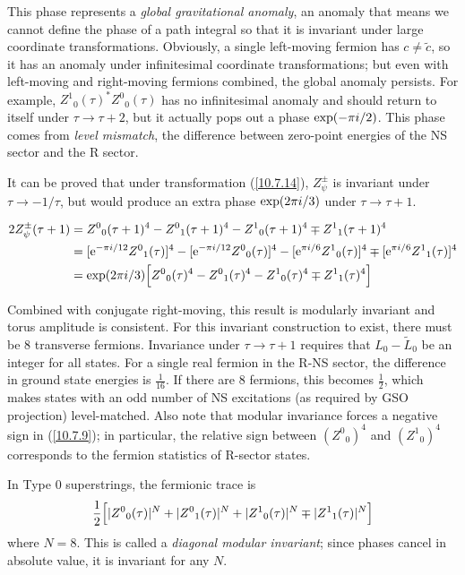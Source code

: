 	This phase represents a \emph{global gravitational anomaly}, an anomaly that means we cannot define the phase of a path integral so that it is invariant under large coordinate transformations. Obviously, a single left-moving fermion has $c\neq\tilde{c}$, so it has an anomaly under infinitesimal coordinate transformations; but even with left-moving and right-moving fermions combined, the global anomaly persists. For example, $Z^{1}{}_{0}(\tau)^{\ast}Z^{0}{}_{0}(\tau)$ has no infinitesimal anomaly and should return to itself under $\tau\to\tau+2$, but it actually pops out a phase $\exp(-\pi i/2)$. This phase comes from \emph{level mismatch}, the difference between zero-point energies of the NS sector and the R sector.
	
	It can be proved that under transformation (\ref{10.7.14}), $Z_{\psi}^{\pm}$ is invariant under $\tau\to-1/\tau$, but would produce an extra phase $\exp(2\pi i/3)$ under $\tau\to\tau+1$.
	\begin{tcolorbox}[breakable]
		\begin{align*}
			2Z_{\psi}^{\pm}(\tau+1) &=Z^{0}{}_{0}(\tau+1)^{4}-Z^{0}{}_{1}(\tau+1)^{4}-Z^{1}{}_{0}(\tau+1)^{4}\mp Z^{1}{}_{1}(\tau+1)^{4} \\
			&= [\mathrm{e}^{-\pi i/12}Z^{0}{}_{1}(\tau)]^{4}-[\mathrm{e}^{-\pi i/12}Z^{0}{}_{0}(\tau)]^{4}
			-[\mathrm{e}^{\pi i/6}Z^{1}{}_{0}(\tau)]^{4}\mp[\mathrm{e}^{\pi i/6}Z^{1}{}_{1}(\tau)]^{4} \\
			&=\exp(2\pi i/3)\Bigl[Z^{0}{}_{0}(\tau)^{4}-Z^{0}{}_{1}(\tau)^{4}-Z^{1}{}_{0}(\tau)^{4}\mp Z^{1}{}_{1}(\tau)^{4}\Bigr]
		\end{align*}
	\end{tcolorbox}
	\noindent Combined with conjugate right-moving, this result is modularly invariant and torus amplitude is consistent. For this invariant construction to exist, there must be 8 transverse fermions. Invariance under $\tau\to\tau+1$ requires that $L_{0}-\tilde{L}_{0}$ be an integer for all states. For a single real fermion in the R-NS sector, the difference in ground state energies is $\frac{1}{16}$. If there are 8 fermions, this becomes $\frac{1}{2}$, which makes states with an odd number of NS excitations (as required by GSO projection) level-matched. Also note that modular invariance forces a negative sign in (\ref{10.7.9}); in particular, the relative sign between $(Z^{0}{}_{0})^{4}$ and $(Z^{1}{}_{0})^{4}$ corresponds to the fermion statistics of R-sector states.
	
	
	In Type 0 superstrings, the fermionic trace is
	\begin{equation}
		\frac{1}{2} \Bigl[\lvert Z^{0}{}_{0}(\tau)\rvert^{N}+\lvert Z^{0}{}_{1}(\tau)\rvert^{N}+\lvert Z^{1}{}_{0}(\tau)\rvert^{N}\mp \lvert Z^{1}{}_{1}(\tau)\rvert^{N} \Bigr] \label{10.7.15}
	\end{equation}
	where $N=8$. This is called a \emph{diagonal modular invariant}; since phases cancel in absolute value, it is invariant for any $N$.
	
